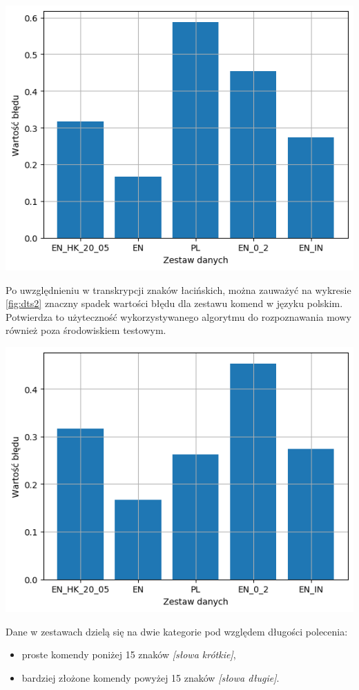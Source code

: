 \begin{center}
    \includegraphics[width=0.7\linewidth]{files/output1.png}
    \label{fig:dts1}
\end{center}

Po uwzględnieniu w transkrypcji znaków łacińskich, można zauważyć na wykresie \ref{fig:dts2} znaczny spadek wartości błędu dla zestawu komend w języku polskim. Potwierdza to użyteczność wykorzystywanego algorytmu do rozpoznawania mowy również poza środowiskiem testowym.

\begin{center}
    \includegraphics[width=0.7\linewidth]{files/output2.png}
    \label{fig:dts2}
\end{center}

Dane w zestawach dzielą się na dwie kategorie pod względem długości polecenia:
\begin{itemize}
    \item proste komendy poniżej 15 znaków \textit{[słowa krótkie]},
    \item bardziej złożone komendy powyżej 15 znaków \textit{[słowa długie]}.
\end{itemize}

